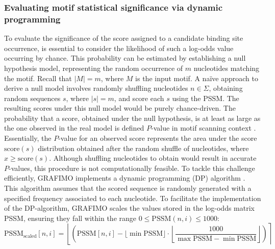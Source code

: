 \documentclass[a4paper, titlepage, openright]{book}
\newcommand{\grafimo}{GRAFIMO\xspace}
\begin{document}
\subsubsection{Evaluating motif statistical significance via dynamic programming}
To evaluate the significance of the score assigned to a candidate binding site occurrence, is essential to consider the likelihood of such a log-odds value occurring by chance. This probability can be estimated by establishing a null hypothesis model, representing the random occurrence of $m$ nucleotides matching the motif. Recall that $|M|=m$, where $M$ is the input motif. A na\"ive approach to derive a null model involves randomly shuffling nucleotides $n \in \Sigma$, obtaining random sequences $s$, where $|s|=m$, and score each $s$ using the PSSM. The resulting scores under this null model would be purely chance-driven. The probability that a score, obtained under the null hypothesis, is at least as large as the one observed in the real model is defined $P$-value in motif scanning context \citep{noble2009does}. Essentially, the $P$-value for an observed score represents the area under the score $\text{score}(s)$ distribution obtained after the random shuffle of nucleotides, where $x \geq \text{score}(s)$. Although shuffling nucleotides to obtain would result in accurate $P$-values, this procedure is not computationally feasible. To tackle this challenge efficiently, \grafimo implements a dynamic programming (DP) algorithm \citep{griffin1994staden}. This algorithm assumes that the scored sequence is randomly generated with a specified frequency associated to each nucleotide. To facilitate the implementation of the DP-algorithm, \grafimo scales the values stored in the log-odds matrix PSSM, ensuring they fall within the range $0 \leq \text{PSSM}(n,i) \leq 1000$:
\[
    \text{PSSM}_{\text{scaled}}[n,i] = \left \lfloor \left ( \text{PSSM}[n,i] - \lfloor \min{\text{PSSM}} \rfloor \cdot \left \lfloor \frac{1000}{\max{\text{PSSM}}-\min{\text{PSSM}}} \right \rfloor \right ) \right \rceil
\]
\end{document}
